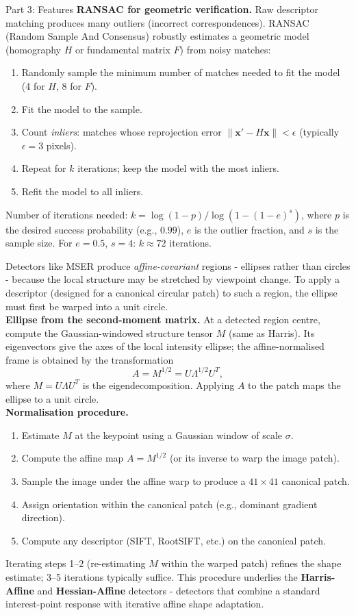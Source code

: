 \documentclass[letterpaper]{article}
\begin{document}
\begin{notes}{Part 3: Features}
\textbf{RANSAC for geometric verification.} Raw descriptor matching produces many outliers (incorrect correspondences). RANSAC (Random Sample And Consensus) robustly estimates a geometric model (homography $H$ or fundamental matrix $F$) from noisy matches:
\begin{enumerate}
    \item Randomly sample the minimum number of matches needed to fit the model (4 for $H$, 8 for $F$).
    \item Fit the model to the sample.
    \item Count \emph{inliers}: matches whose reprojection error $\|\mathbf{x}' - H\mathbf{x}\| < \epsilon$ (typically $\epsilon = 3$ pixels).
    \item Repeat for $k$ iterations; keep the model with the most inliers.
    \item Refit the model to all inliers.
\end{enumerate}
Number of iterations needed: $k = \log(1-p)/\log(1-(1-e)^s)$, where $p$ is the desired success probability (e.g., $0.99$), $e$ is the outlier fraction, and $s$ is the sample size. For $e=0.5$, $s=4$: $k \approx 72$ iterations.


Detectors like MSER produce \emph{affine-covariant} regions - ellipses rather than circles - because the local structure may be stretched by viewpoint change. To apply a descriptor (designed for a canonical circular patch) to such a region, the ellipse must first be warped into a unit circle.\\

\textbf{Ellipse from the second-moment matrix.} At a detected region centre, compute the Gaussian-windowed structure tensor $M$ (same as Harris). Its eigenvectors give the axes of the local intensity ellipse; the affine-normalised frame is obtained by the transformation
$$A = M^{1/2} = U\Lambda^{1/2}U^T,$$
where $M = U\Lambda U^T$ is the eigendecomposition. Applying $A$ to the patch maps the ellipse to a unit circle.\\

\textbf{Normalisation procedure.}
\begin{enumerate}
    \item Estimate $M$ at the keypoint using a Gaussian window of scale $\sigma$.
    \item Compute the affine map $A = M^{1/2}$ (or its inverse to warp the image patch).
    \item Sample the image under the affine warp to produce a $41\times41$ canonical patch.
    \item Assign orientation within the canonical patch (e.g., dominant gradient direction).
    \item Compute any descriptor (SIFT, RootSIFT, etc.) on the canonical patch.
\end{enumerate}
Iterating steps 1–2 (re-estimating $M$ within the warped patch) refines the shape estimate; 3–5 iterations typically suffice. This procedure underlies the \textbf{Harris-Affine} and \textbf{Hessian-Affine} detectors - detectors that combine a standard interest-point response with iterative affine shape adaptation.


\end{notes}
\end{document}
